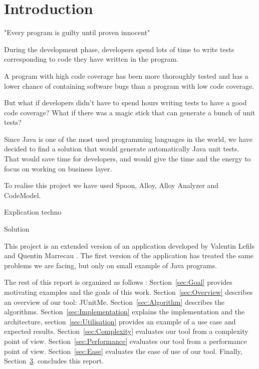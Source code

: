 \chapter*{Introduction}
	\thispagestyle{introduction}
	"Every program is guilty until proven innocent"
	
	During the development phase, developers spend lots of time to write tests corresponding to code they have written in the program.
	
	A program with high code coverage has been more thoroughly tested and has a lower chance of containing software bugs than a program with low code coverage.\cite{CodeCoverage}
	
	But what if developers didn't have to spend hours writing tests to have a good code coverage? What if there was a magic stick that can generate a bunch of unit tests? 
	
Since Java is one of the most used programming languages in the world, we have decided to find a solution that would generate automatically Java unit tests. That would save time for developers, and would give the time and the energy to focus on working on business layer.

To realise this project we have used Spoon, Alloy, Alloy Analyzer and CodeModel.
 
 Explication techno
 
 Solution

This project is an extended version of an application developed by Valentin Lefils and Quentin Marrecau \cite{JUnitMeRapport} \cite{JUnitMeGitHub} . The first version of the application has treated the same problems we are facing, but only on small example of Java programs.

The rest of this report is organized as follows : Section~\ref{sec:Goal} provides motivating examples and the goals of this work.
Section~\ref{sec:Overview} describes an overview of our tool: JUnitMe.
Section~\ref{sec:Algorithm} describes the algorithms. Section~\ref{sec:Implementation} explains the implementation and the architecture, section~\ref{sec:Utilisation} provides an example of a use case and expected results.
Section~\ref{sec:Complexity} evaluates our tool from a complexity point of view. Section~\ref{sec:Performance} evaluates our tool from a performance point of view. Section~\ref{sec:Ease} evaluates the ease of use of our tool.
Finally, Section~\hyperref[ch:Conclusion]{3}. concludes this report.